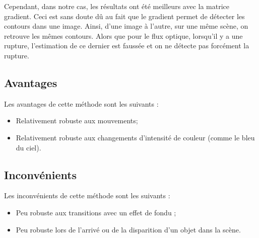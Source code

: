 Cependant, dans notre cas, les résultats ont été meilleurs avec la matrice gradient. Ceci est sans doute dû au fait que le gradient permet de détecter les contours dans une image. Ainsi, d'une image à l'autre, sur une même scène, on retrouve les mêmes contours. Alors que pour le flux optique, lorsqu'il y a une rupture, l'estimation de ce dernier est faussée et on ne détecte pas forcément la rupture.

\subsection{Avantages}

Les avantages de cette méthode sont les suivants :

\begin{itemize}
	\item Relativement robuste aux mouvements;
	\item Relativement robuste aux changements d'intensité de couleur (comme le bleu du ciel).
\end{itemize}

\subsection{Inconvénients}

Les inconvénients de cette méthode sont les suivants :

\begin{itemize}
	\item Peu robuste aux transitions avec un effet de fondu ;
	\item Peu robuste lors de l'arrivé ou de la disparition d'un objet dans la scène.
\end{itemize}
